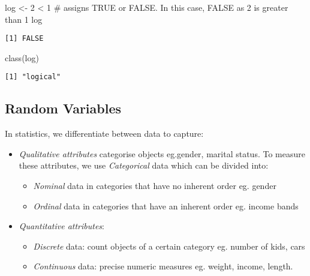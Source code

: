 \documentclass[
  letterpaper,
  krantz2]{style/krantz}
\newenvironment{Shaded}{\begin{snugshade}}{\end{snugshade}}
\newcommand{\CommentTok}[1]{\textcolor[rgb]{0.37,0.37,0.37}{#1}}
\newcommand{\DecValTok}[1]{\textcolor[rgb]{0.68,0.00,0.00}{#1}}
\newcommand{\FunctionTok}[1]{\textcolor[rgb]{0.28,0.35,0.67}{#1}}
\newcommand{\NormalTok}[1]{\textcolor[rgb]{0.00,0.23,0.31}{#1}}
\newcommand{\OtherTok}[1]{\textcolor[rgb]{0.00,0.23,0.31}{#1}}
\newcommand{\SpecialCharTok}[1]{\textcolor[rgb]{0.37,0.37,0.37}{#1}}
\providecommand{\tightlist}{%
  \setlength{\itemsep}{0pt}\setlength{\parskip}{0pt}}\usepackage{longtable,booktabs,array}
\begin{document}
\begin{Shaded}
\begin{Highlighting}[]
\NormalTok{log }\OtherTok{\textless{}{-}} \DecValTok{2} \SpecialCharTok{\textless{}} \DecValTok{1} \CommentTok{\# assigns TRUE or FALSE. In this case, FALSE as 2 is greater than 1}
\NormalTok{log}
\end{Highlighting}
\end{Shaded}

\begin{verbatim}
[1] FALSE
\end{verbatim}

\begin{Shaded}
\begin{Highlighting}[]
\FunctionTok{class}\NormalTok{(log)}
\end{Highlighting}
\end{Shaded}

\begin{verbatim}
[1] "logical"
\end{verbatim}

\hypertarget{random-variables}{%
\subsection{Random Variables}\label{random-variables}}

In statistics, we differentiate between data to capture:

\begin{itemize}
\item
  \emph{Qualitative attributes} categorise objects eg.gender, marital
  status. To measure these attributes, we use \emph{Categorical} data
  which can be divided into:

  \begin{itemize}
  \tightlist
  \item
    \emph{Nominal} data in categories that have no inherent order eg.
    gender
  \item
    \emph{Ordinal} data in categories that have an inherent order eg.
    income bands
  \end{itemize}
\item
  \emph{Quantitative attributes}:

  \begin{itemize}
  \tightlist
  \item
    \emph{Discrete} data: count objects of a certain category eg. number
    of kids, cars
  \item
    \emph{Continuous} data: precise numeric measures eg. weight, income,
    length.
  \end{itemize}
\end{itemize}
\end{document}
